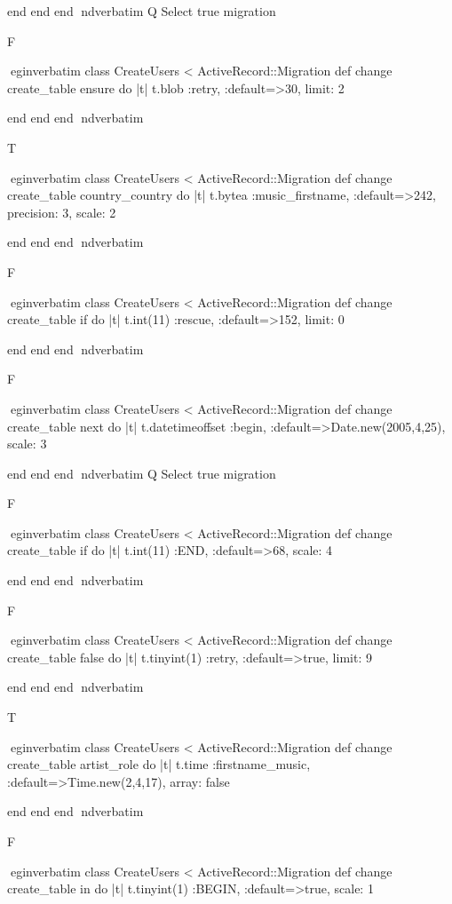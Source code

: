     end 
  end 
end
nd{verbatim}
Q
 Select true migration

F

egin{verbatim}
 class CreateUsers < ActiveRecord::Migration 
  def change 
    create_table ensure do |t| 
      t.blob :retry, :default=>30, limit: 2
    
    end 
  end 
end
nd{verbatim}

T

egin{verbatim}
 class CreateUsers < ActiveRecord::Migration 
  def change 
    create_table country_country do |t| 
      t.bytea :music_firstname, :default=>242, precision: 3, scale: 2
    
    end 
  end 
end
nd{verbatim}

F

egin{verbatim}
 class CreateUsers < ActiveRecord::Migration 
  def change 
    create_table if do |t| 
      t.int(11) :rescue, :default=>152, limit: 0
    
    end 
  end 
end
nd{verbatim}

F

egin{verbatim}
 class CreateUsers < ActiveRecord::Migration 
  def change 
    create_table next do |t| 
      t.datetimeoffset :begin, :default=>Date.new(2005,4,25), scale: 3
    
    end 
  end 
end
nd{verbatim}
Q
 Select true migration

F

egin{verbatim}
 class CreateUsers < ActiveRecord::Migration 
  def change 
    create_table if do |t| 
      t.int(11) :END, :default=>68, scale: 4
    
    end 
  end 
end
nd{verbatim}

F

egin{verbatim}
 class CreateUsers < ActiveRecord::Migration 
  def change 
    create_table false do |t| 
      t.tinyint(1) :retry, :default=>true, limit: 9
    
    end 
  end 
end
nd{verbatim}

T

egin{verbatim}
 class CreateUsers < ActiveRecord::Migration 
  def change 
    create_table artist_role do |t| 
      t.time :firstname_music, :default=>Time.new(2,4,17), array: false
    
    end 
  end 
end
nd{verbatim}

F

egin{verbatim}
 class CreateUsers < ActiveRecord::Migration 
  def change 
    create_table in do |t| 
      t.tinyint(1) :BEGIN, :default=>true, scale: 1
    
